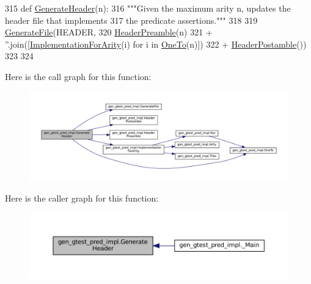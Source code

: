 \begin{DoxyCode}
315 \textcolor{keyword}{def }\hyperlink{namespacegen__gtest__pred__impl_a6f3039a82a5283846fb272f8a3af6743}{GenerateHeader}(n):
316   \textcolor{stringliteral}{"""Given the maximum arity n, updates the header file that implements}
317 \textcolor{stringliteral}{  the predicate assertions."""}
318 
319   \hyperlink{namespacegen__gtest__pred__impl_a16210fe365dfd176e04aa2578ac5a8d9}{GenerateFile}(HEADER,
320                \hyperlink{namespacegen__gtest__pred__impl_a0b99cadcffab4bf161654a382163bac8}{HeaderPreamble}(n)
321                + \textcolor{stringliteral}{''}.join([\hyperlink{namespacegen__gtest__pred__impl_a8c53b141b89f9c05d0131d9756dfeab0}{ImplementationForArity}(i) \textcolor{keywordflow}{for} i \textcolor{keywordflow}{in} 
      \hyperlink{namespacegen__gtest__pred__impl_a7920598d51c9dded76a4ef9ffde339e4}{OneTo}(n)])
322                + \hyperlink{namespacegen__gtest__pred__impl_a3d40c7ef70cf4d46e56c9612f34027bf}{HeaderPostamble}())
323 
324 
\end{DoxyCode}
Here is the call graph for this function\+:
\nopagebreak
\begin{figure}[H]
\begin{center}
\leavevmode
\includegraphics[width=350pt]{namespacegen__gtest__pred__impl_a6f3039a82a5283846fb272f8a3af6743_cgraph}
\end{center}
\end{figure}
Here is the caller graph for this function\+:
\nopagebreak
\begin{figure}[H]
\begin{center}
\leavevmode
\includegraphics[width=350pt]{namespacegen__gtest__pred__impl_a6f3039a82a5283846fb272f8a3af6743_icgraph}
\end{center}
\end{figure}
\mbox{\label{namespacegen__gtest__pred__impl_acbd42b5b7fb7ddbb06a4dd58fc37e9ed}} 

